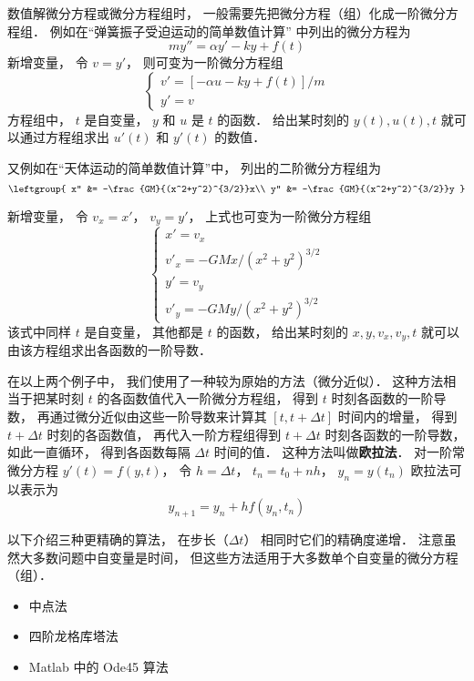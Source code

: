 

数值解微分方程或微分方程组时， 一般需要先把微分方程（组）化成一阶微分方程组． 例如在“弹簧振子受迫运动的简单数值计算” 中列出的微分方程为
\begin{equation}
m y'' = \alpha y' - ky + f(t)
\end{equation}
新增变量， 令 $v = y'$， 则可变为一阶微分方程组
\begin{equation}
\begin{cases}
v' = [-\alpha u - ky + f(t)]/m\\
y' = v
\end{cases}
\end{equation}
方程组中， $t$ 是自变量， $y$ 和 $u$ 是 $t$ 的函数． 给出某时刻的 $y(t), u(t), t$ 就可以通过方程组求出 $u'(t)$ 和 $y'(t)$ 的数值．

又例如在“天体运动的简单数值计算”中， 列出的二阶微分方程组为
\begin{equation}
\leftgroup{
x'' &= -\frac{GM}{(x^2+y^2)^{3/2}}x\\
y'' &= -\frac{GM}{(x^2+y^2)^{3/2}}y
}\end{equation}

新增变量， 令 $v_x = x'$， $v_y = y'$， 上式也可变为一阶微分方程组
\begin{equation}\label{OdeNum_eq4}
\begin{cases}
x' = v_x\\
v'_x = -GMx/(x^2 + y^2)^{3/2}\\
y' = v_y\\
v'_y = -GMy/(x^2 + y^2)^{3/2}
\end{cases}
\end{equation}
该式中同样 $t$ 是自变量， 其他都是 $t$ 的函数， 给出某时刻的 $x, y, v_x, v_y, t$ 就可以由该方程组求出各函数的一阶导数．

在以上两个例子中， 我们使用了一种较为原始的方法（微分近似）． 这种方法相当于把某时刻 $t$ 的各函数值代入一阶微分方程组， 得到 $t$ 时刻各函数的一阶导数， 再通过微分近似由这些一阶导数来计算其 $[t, t + \Delta t]$ 时间内的增量， 得到 $t +\Delta t$ 时刻的各函数值， 再代入一阶方程组得到 $t +\Delta t$ 时刻各函数的一阶导数， 如此一直循环， 得到各函数每隔 $\Delta t$ 时间的值． 这种方法叫做\textbf{欧拉法}． 对一阶常微分方程 $y'(t) = f(y, t)$， 令 $h = \Delta t$， $t_n = t_0 + nh$， $y_n = y(t_n)$ 欧拉法可以表示为
\begin{equation}\label{OdeNum_eq5}
y_{n+1} = y_n + h f(y_n, t_n)
\end{equation}

以下介绍三种更精确的算法， 在步长（$\Delta t$） 相同时它们的精确度递增． 注意虽然大多数问题中自变量是时间， 但这些方法适用于大多数单个自变量的微分方程（组）．

\begin{itemize}
\item 中点法
\item 四阶龙格库塔法
\item Matlab 中的 Ode45 算法
\end{itemize}












